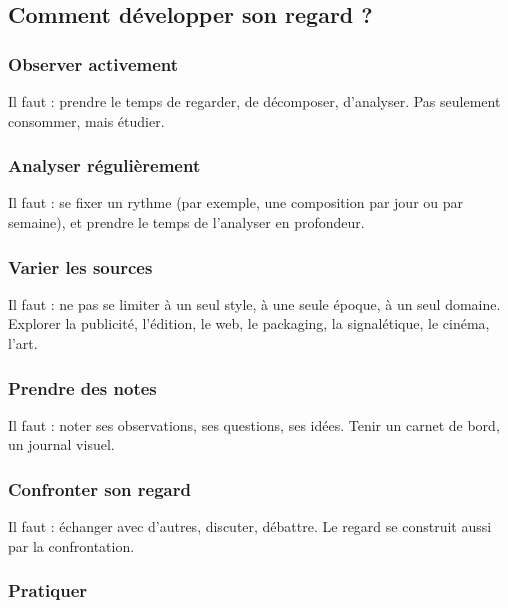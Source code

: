 \subsection{Comment développer son regard ?}

\subsubsection{Observer activement}

Il faut  : prendre le temps de regarder, de décomposer, d'analyser. Pas seulement consommer, mais étudier.

\subsubsection{Analyser régulièrement}

Il faut  : se fixer un rythme (par exemple, une composition par jour ou par semaine), et prendre le temps de l'analyser en profondeur.

\subsubsection{Varier les sources}

Il faut  : ne pas se limiter à un seul style, à une seule époque, à un seul domaine. Explorer la publicité, l'édition, le web, le packaging, la signalétique, le cinéma, l'art.

\subsubsection{Prendre des notes}

Il faut  : noter ses observations, ses questions, ses idées. Tenir un carnet de bord, un journal visuel.

\subsubsection{Confronter son regard}

Il faut  : échanger avec d'autres, discuter, débattre. Le regard se construit aussi par la confrontation.

\subsubsection{Pratiquer}

